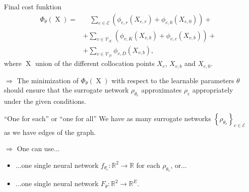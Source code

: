 \documentclass[9pt]{beamer}
\begin{document}
\begin{frame}{Final cost funktion}
    \begin{equation*}
        \begin{aligned} 
            \Phi_{\theta} \left( \operatorname{X} \right)  = & \quad \sum_{e \in \mathcal{E}}  \left(  \phi_{e,r}  \left( X_{e,r} \right) + \phi_{e,0}  \left( X_{e,0} \right)  \right) + \\
            & + \sum_{v \in \mathcal{V}_\mathcal{K}}  \left(  \phi_{v,K}  \left( X_{v,b} \right) + \phi_{v,c} \left( X_{v,b} \right)  \right) + \\
            & + \sum_{v \in \mathcal{V}_\mathcal{D}} \phi_{v,D} \left( X_{v,b} \right),
        \end{aligned}
    \end{equation*}
    where $\operatorname{X}$ union of the different collocation points $X_e$, $X_{v,b}$ and $X_{e,0}$. \\

    \vspace{3mm}

    $\Rightarrow$ The minimization of $\Phi_{\theta} \left( \operatorname{X} \right)$ with respect to the learnable parameters $\theta$ should ensure that the surrogate network $\rho_{\theta_e}$ approximates $\rho_{e}$ appropriately under the given conditions. 
\end{frame}



\begin{frame}{“One for each” or “one for all”}
    We have as many surrogate networks $\left\{ \rho_{\theta_e} \right\}_{e \in \mathcal{E}}$ as we have edges of the graph. \\

    \vspace{5mm}

    $\Rightarrow$ One can use$\ldots$
    \begin{itemize}
        \item $\ldots$one single neural network $f_{\theta_e} \colon \mathbb{R}^2 \to \mathbb{R}$ for each $\rho_{\theta_e}$, or$\ldots$
        \item $\ldots$one single neural network $F_{\theta} \colon \mathbb{R}^2 \to \mathbb{R}^E$.
    \end{itemize}
\end{frame}
\end{document}

